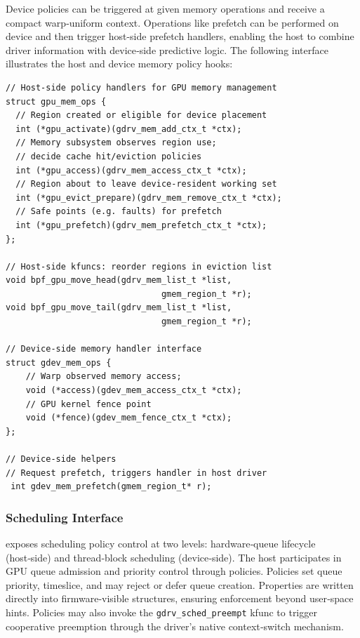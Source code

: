 Device policies can be triggered at given memory operations and receive a compact warp‑uniform context. Operations like prefetch can be performed on device and then trigger host-side prefetch handlers, enabling the host to combine driver information with device‑side predictive logic. The following interface illustrates the host and device memory policy hooks:

\begin{lstlisting}
// Host-side policy handlers for GPU memory management
struct gpu_mem_ops {
  // Region created or eligible for device placement
  int (*gpu_activate)(gdrv_mem_add_ctx_t *ctx);
  // Memory subsystem observes region use;
  // decide cache hit/eviction policies
  int (*gpu_access)(gdrv_mem_access_ctx_t *ctx);
  // Region about to leave device-resident working set
  int (*gpu_evict_prepare)(gdrv_mem_remove_ctx_t *ctx);
  // Safe points (e.g. faults) for prefetch
  int (*gpu_prefetch)(gdrv_mem_prefetch_ctx_t *ctx);
};

// Host-side kfuncs: reorder regions in eviction list
void bpf_gpu_move_head(gdrv_mem_list_t *list,
                               gmem_region_t *r);
void bpf_gpu_move_tail(gdrv_mem_list_t *list,
                               gmem_region_t *r);

// Device-side memory handler interface
struct gdev_mem_ops {
    // Warp observed memory access;
    void (*access)(gdev_mem_access_ctx_t *ctx);
    // GPU kernel fence point
    void (*fence)(gdev_mem_fence_ctx_t *ctx);
};

// Device-side helpers
// Request prefetch, triggers handler in host driver
 int gdev_mem_prefetch(gmem_region_t* r);
\end{lstlisting}

\subsubsection{Scheduling Interface}
\label{sec:design-sched}

\sys exposes scheduling policy control at two levels: hardware‑queue lifecycle (host‑side) and thread‑block scheduling (device‑side). The host participates in GPU queue admission and priority control through policies. Policies set queue priority, timeslice, and may reject or defer queue creation. Properties are written directly into firmware‑visible structures, ensuring enforcement beyond user‑space hints. Policies may also invoke the \texttt{gdrv\_sched\_preempt} kfunc to trigger cooperative preemption through the driver's native context‑switch mechanism.

